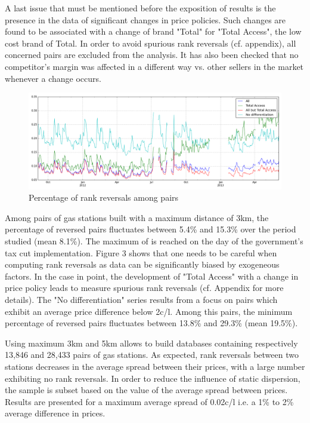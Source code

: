 \documentclass[11pt]{article}
\begin{document}
A last issue that must be mentioned before the exposition of results is the presence in the data of significant changes in price policies. Such changes are found to be associated with a change of brand "Total" for "Total Access", the low cost brand of Total. In order to avoid spurious rank reversals (cf. appendix), all concerned pairs are excluded from the analysis. It has also been checked that no competitor's margin was affected in a different way vs. other sellers in the market whenever a change occurs.

\begin{figure}[!h]
    \caption{Percentage of rank reversals among pairs}
	\centering
		\includegraphics[width=16cm]{graphs/ecdf_rr_temporal.png}
\end{figure}

Among pairs of gas stations built with a maximum distance of 3km, the percentage of reversed pairs fluctuates between 5.4\% and 15.3\% over the period studied (mean 8.1\%). The maximum of is reached on the day of the government's tax cut implementation. Figure 3 shows that one needs to be careful when computing rank reversals as data can be significantly biased by exogeneous factors. In the case in point, the development of "Total Access" with a change in price policy leads to measure spurious rank reversals (cf. Appendix for more details). The "No differentiation" series results from a focus on pairs which exhibit an average price difference below 2c/l. Among this pairs, the minimum percentage of reversed pairs fluctuates between 13.8\% and 29.3\% (mean 19.5\%).

Using maximum 3km and 5km allows to build databases containing respectively 13,846 and 28,433 pairs of gas stations. As expected, rank reversals between two stations decreases in the average spread between their prices, with a large number exhibiting no rank reversals. In order to reduce the influence of static dispersion, the sample is subset based on the value of the average spread between prices. Results are presented for a maximum average spread of 0.02c/l i.e. a 1\% to 2\% average difference in prices. 
\end{document}
